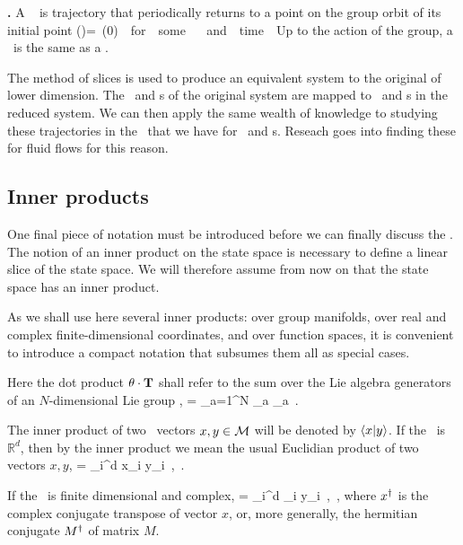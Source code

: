 {\begin{definition}
\textbf{\Rpo.}
A \rpo\  is trajectory that periodically returns to a point on the group orbit of its initial point
\beq
\ssp(\tau*)=\LieEl \, \ssp(0) \,\, for \,\,  some \,\, \LieEl \in \Group \,\, and \,\, time \,\, \tau*
\eeq
Up to the action of the group, a \rpo\ is the same as a \po.
\end{definition}

The method of slices is used to produce an equivalent system to the original of lower dimension. The \reqva\ and \rpo s of the original system are mapped to \eqva\ and \po s in the reduced system. We can then apply the same wealth of knowledge to studying these trajectories in the \reducedsp\ that we have for \eqva\ and \po s. Reseach goes into finding these for fluid flows  for this reason.

    \ifarticle
    \else


\subsection{Inner products}
\label{def:innerProduct}

One final piece of notation must be introduced before we can finally discuss the \mslices.
The notion of an inner product on the state space is necessary to define a linear slice of the state space. We will therefore assume from now on that the state space has an inner product.

As we shall use here several inner products:
over group manifolds, over real and complex finite-dimensional coordinates, and over function spaces, it is convenient to introduce a compact notation that subsumes them all as special cases.

Here the dot product ${\bf \theta} \cdot \mathbf{T}$ shall refer to the sum over
the Lie algebra generators of an $N$-dimensional Lie group \Group,
\beq
\gSpace \cdot \Lg = \sum_{a=1}^N \gSpace_a \Lg_a
\,.

The inner product of two \statesp\ vectors $x, y \in {\cal M}$ will be denoted by $\left\langle {x}|{y} \right\rangle$. If the \statesp\ is $\mathbb{R}^d$, then by the inner product we mean the usual Euclidian product of two vectors $x,y$,
\beq
{} = \sum_i^d {x}_i y_i
    \,,\qquad \pS \subset \reals
\,.

If the \statesp\ is finite dimensional and complex,
\beq
{} = \sum_i^d _i y_i
    \,,\qquad \pS \subset \complex
\,,
where ${x}^\dag$ is the complex conjugate transpose of vector $x$, or, more generally, the hermitian conjugate ${M}^\dag$ of matrix $M$.

}
